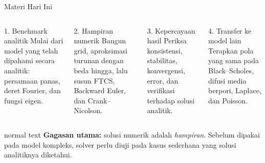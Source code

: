 \documentclass[aspectratio=169,10pt]{beamer}
\begin{document}
\begin{frame}{Materi Hari Ini}
\small
\begin{columns}[T,onlytextwidth]
\begin{block}{1. Benchmark analitik}
Mulai dari model yang telah dipahami secara analitik: persamaan panas, deret Fourier, dan fungsi eigen.
\end{block}
\begin{block}{2. Hampiran numerik}
Bangun grid, aproksimasi turunan dengan beda hingga, lalu susun FTCS, Backward Euler, dan Crank--Nicolson.
\end{block}
\begin{block}{3. Kepercayaan hasil}
Periksa konsistensi, stabilitas, konvergensi, error, dan verifikasi terhadap solusi analitik.
\end{block}
\begin{block}{4. Transfer ke model lain}
Terapkan pola yang sama pada Black--Scholes, difusi media berpori, Laplace, dan Poisson.
\end{block}
\end{columns}
\vspace{0.15cm}
\begin{beamercolorbox}[sep=.14cm,wd=\textwidth]{normal text}
\centering
\textbf{Gagasan utama:} solusi numerik adalah \emph{hampiran}. Sebelum dipakai pada model kompleks, solver perlu diuji pada kasus sederhana yang solusi analitiknya diketahui.
\end{beamercolorbox}
\vspace{0.08cm}
\end{frame}
\end{document}
